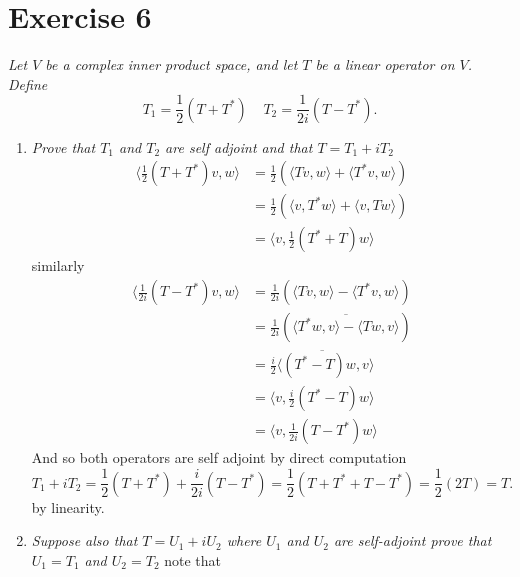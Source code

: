 \documentclass{article}
\begin{document}
    \section{Exercise 6}
    \emph{
        Let $V$ be a complex inner product space, and let $T$ be a linear operator on $V$. Define
        \[
        T_1 = \frac{1}{2}(T + T^{*}) \;\;\;\; T_2 = \frac{1}{2i}(T-T^{*})
        .\] 
    }
    \begin{enumerate}[label = (\alph*)]
        \item \emph{Prove that $T_1$ and $T_2$ are self adjoint and that $T = T_1 + iT_2$}\\
            \begin{align*}
                \langle \frac{1}{2}(T +T^{*})v, w \rangle &= \frac{1}{2}(\langle Tv, w \rangle + \langle T^{*}v,w \rangle )\\
                                  &= \frac{1}{2}( \langle v, T^{*}w \rangle + \langle v, Tw \rangle )\\
                                  &=  \langle v, \frac{1}{2}(T^{*} + T)w \rangle
            \end{align*}
            similarly
            \begin{align*}
                \langle \frac{1}{2i} (T-T^{*})v, w \rangle &= \frac{1}{2i}( \langle Tv, w \rangle - \langle T^{*}v, w \rangle )\\
                                                           &= \frac{1}{2i}( \overline{\langle T^{*}w, v \rangle - \langle Tw, v \rangle} )\\
                                                           &= \overline{\frac{i}{2}  \langle (T^{*} - T)w, v \rangle}\\
                                                           &= \langle v, \frac{i}{2}(T^{*}- T)w \rangle\\
                                                           &= \langle v, \frac{1}{2i}(T - T^{*})w \rangle
            \end{align*}
            And so both operators are self adjoint
            by direct computation
            \[
            T_1 + iT_2 = \frac{1}{2}(T + T^{*}) + \frac{i}{2i}(T - T^{*}) = \frac{1}{2}(T + T^{*} + T - T^{*}) = \frac{1}{2}(2T) = T
            .\] 
            by linearity.
        \item \emph{ Suppose also that $T = U_1 + iU_2$ where $U_1$ and $U_2$ are self-adjoint prove that
            $U_1 = T_1$ and $U_2 = T_2$ }
            note that
            \begin{align*}

\end{align*}
\end{enumerate}
\end{document}
